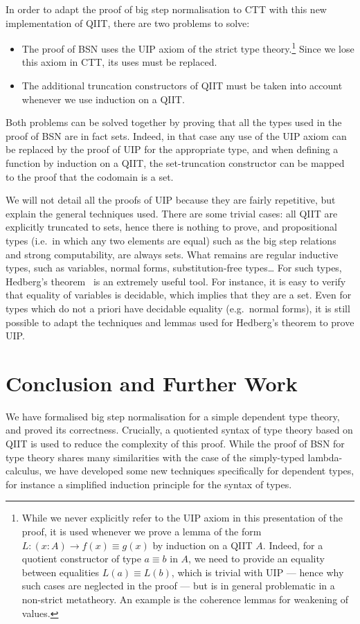\documentclass[a4paper,english]{lipics-v2019}
\begin{document}
In order to adapt the proof of big step normalisation to CTT with this new
implementation of QIIT, there are two problems to solve:
\begin{itemize}
\item The proof of BSN uses the UIP axiom of the strict type theory.\footnote{%
    While we never explicitly refer to the UIP axiom in this presentation of the
    proof, it is used whenever we prove a lemma of the form
    $L : (x : A) \to f(x) \equiv g(x)$ by induction on a QIIT $A$.
    Indeed, for a quotient constructor of type $a \equiv b$ in $A$, we need to
    provide an equality between equalities $L(a) \equiv L(b)$, which is trivial
    with UIP --- hence why such cases are neglected in the proof --- but is
    in general problematic in a non-strict metatheory.
    An example is the coherence lemmas for weakening of values.
  }
  Since we lose this axiom in CTT, its uses must be replaced.
\item The additional truncation constructors of QIIT must be taken into account
  whenever we use induction on a QIIT.
\end{itemize}
Both problems can be solved together by proving that all the types used in the
proof of BSN are in fact sets. Indeed, in that case any use of the UIP axiom
can be replaced by the proof of UIP for the appropriate type, and when defining
a function by induction on a QIIT, the set-truncation constructor can be mapped
to the proof that the codomain is a set.

We will not detail all the proofs of UIP because they are fairly repetitive, but
explain the general techniques used. There are some trivial cases: all QIIT are
explicitly truncated to sets, hence there is nothing to prove, and propositional
types (i.e.\ in which any two elements are equal) such as the big step
relations and strong computability, are always sets. What remains are regular
inductive types, such as variables, normal forms, substitution-free types\dots{}
For such types, Hedberg's theorem~\cite{hedberg1998coherence} is an extremely
useful tool. For instance, it is easy to verify that equality of variables is
decidable, which implies that they are a set. Even for types which do not a
priori have decidable equality (e.g.\ normal forms), it is still possible to
adapt the techniques and lemmas used for Hedberg's theorem to prove UIP.

\section{Conclusion and Further Work}
We have formalised big step normalisation for a simple dependent type theory,
and proved its correctness. Crucially, a quotiented syntax of type theory based
on QIIT is used to reduce the complexity of this proof. While the proof of BSN
for type theory shares many similarities with the case of the simply-typed
lambda-calculus, we have developed some new techniques specifically for
dependent types, for instance a simplified induction principle for the syntax
of types.
\end{document}
